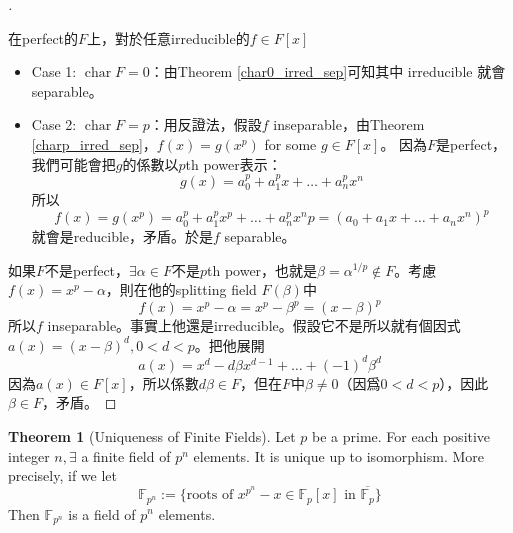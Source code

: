 \documentclass{article}
\theoremstyle{definition}
\newtheorem{thm}{Theorem}
\newtheorem{dfn}{Definition}
\newenvironment{proofs}[1][\proofname]{%
  \begin{proof}[#1]$ $\par\nobreak\ignorespaces
}{%
  \end{proof}
}
\DeclareMathOperator{\Char}{char}
\begin{document}
\begin{proofs}
	在perfect的$F$上，對於任意irreducible的$f\in F[x]$
	\begin{itemize}
		\item Case 1: $\Char F=0$：由Theorem \ref{char0_irred_sep}可知其中 irreducible 就會 separable。
		\item Case 2: $\Char F=p$：用反證法，假設$f$ inseparable，由Theorem \ref{charp_irred_sep}，$f(x)=g(x^p)$ for some $g\in F[x]$。
		因為$F$是perfect，我們可能會把$g$的係數以$p$th power表示：
		\[g(x)=a_0^p+a_1^p x+\dots+a_n^p x^n\]
		所以
		\[f(x)=g(x^p)=a_0^p+a_1^p x^p +\dots + a_n^p x^np=(a_0+a_1x+\dots+a_n x^n)^p\]
		就會是reducible，矛盾。於是$f$ separable。
	\end{itemize}

	如果$F$不是perfect，$\exists \alpha\in F$不是$p$th power，也就是$\beta=\alpha^{1/p}\notin F$。考慮$f(x)=x^p-\alpha$，則在他的splitting field $F(\beta)$中
	\[f(x)=x^p-\alpha=x^p-\beta^p=(x-\beta)^p\]
	所以$f$ inseparable。事實上他還是irreducible。假設它不是所以就有個因式$a(x)=(x-\beta)^d, 0<d<p$。把他展開
	\[a(x)=x^d-d\beta x^{d-1}+\dots+(-1)^d\beta^d\]
	因為$a(x)\in F[x]$，所以係數$d\beta\in F$，但在$F$中$\beta\neq 0$（因爲$0<d<p$），因此$\beta \in F$，矛盾。
\end{proofs}



\clearpage
\begin{thm}[Uniqueness of Finite Fields]
	Let $p$ be a prime.
	For each positive integer $n, \exists$ a finite field of $p^n$ elements.
	It is unique up to isomorphism.
	More precisely, if we let 
	\[
		\mathbb{F}_{p^n}:= \{ \text{roots of } x^{p^n} - x \in \mathbb{F}_p[x] \text{ in } \overline{\mathbb{F}_p} \}
	\]
	Then $\mathbb{F}_{p^n}$ is a field of $p^n$ elements.
\end{thm}
\end{document}
